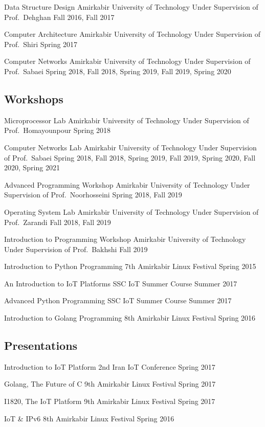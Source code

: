 \cventry{}
  {Data Structure Design}
  {}
  {Amirkabir University of Technology}
  {Under Supervision of Prof.\ Dehghan}
  {Fall 2016, Fall 2017}

\cventry{}
  {Computer Architecture}
  {}
  {Amirkabir University of Technology}
  {Under Supervision of Prof.\ Shiri}
  {Spring 2017}

\cventry{}
  {Computer Networks}
  {}
  {Amirkabir University of Technology}
  {Under Supervision of Prof.\ Sabaei}
  {Spring 2018, Fall 2018, Spring 2019, Fall 2019, Spring 2020}

\subsection{Workshops}

\cventry{}
  {Microprocessor Lab}
  {}
  {Amirkabir University of Technology}
  {Under Supervision of Prof.\ Homayounpour}
  {Spring 2018}

\cventry{}
  {Computer Networks Lab}
  {}
  {Amirkabir University of Technology}
  {Under Supervision of Prof.\ Sabaei}
  {Spring 2018, Fall 2018, Spring 2019, Fall 2019, Spring 2020, Fall 2020, Spring 2021}

\cventry{}
  {Advanced Programming Workshop}
  {}
  {Amirkabir University of Technology}
  {Under Supervision of Prof.\ Noorhosseini}
  {Spring 2018, Fall 2019}

\cventry{}
  {Operating System Lab}
  {}
  {Amirkabir University of Technology}
  {Under Supervision of Prof.\ Zarandi}
  {Fall 2018, Fall 2019}

\cventry{}
  {Introduction to Programming Workshop}
  {}
  {Amirkabir University of Technology}
  {Under Supervision of Prof.\ Bakhshi}
  {Fall 2019}

\cventry{}
  {Introduction to Python Programming}
  {}
  {7th Amirkabir Linux Festival}
  {}
  {Spring 2015}

\cventry{}
  {An Introduction to IoT Platforms}
  {}
  {SSC IoT Summer Course}
  {}
  {Summer 2017}

\cventry{}
  {Advanced Python Programming}
  {}
  {SSC IoT Summer Course}
  {}
  {Summer 2017}

\cventry{}
  {Introduction to Golang Programming}
  {}
  {8th Amirkabir Linux Festival}
  {}
  {Spring 2016}

\subsection{Presentations}

\cventry{}
  {Introduction to IoT Platform}
  {}
  {2nd Iran IoT Conference}
  {}
  {Spring 2017}

\cventry{}
  {Golang, The Future of C}
  {}
  {9th Amirkabir Linux Festival}
  {}
  {Spring 2017}

\cventry{}
  {I1820, The IoT Platform}
  {}
  {9th Amirkabir Linux Festival}
  {}
  {Spring 2017}

\cventry{}
  {IoT \& IPv6}
  {}
  {8th Amirkabir Linux Festival}
  {}
  {Spring 2016}
